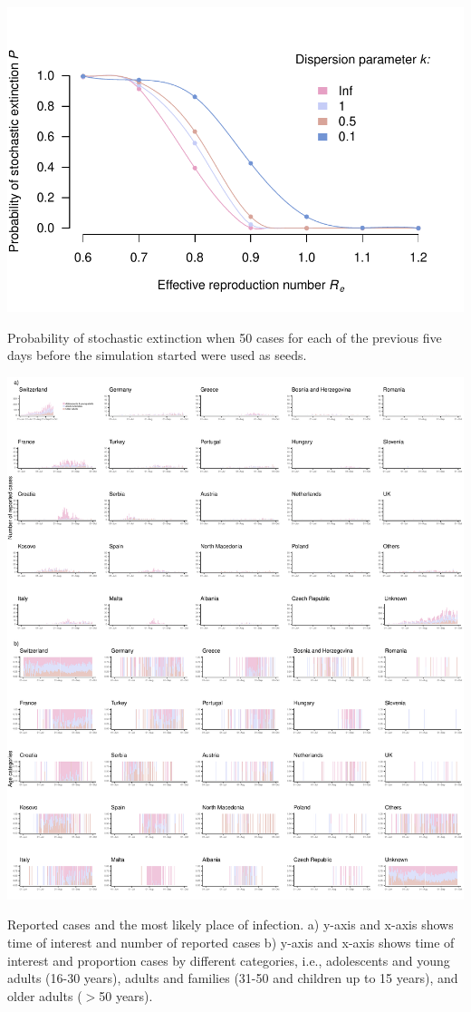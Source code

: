 \documentclass[10pt, a4paper, twoside]{article}
\begin{document}
\clearpage
\begin{suppfigure}[h]
\centering
\includegraphics[scale=0.5]{P_extinction_2021-02-26.pdf}
\caption{Probability of stochastic extinction when 50 cases for each of the previous five days before the simulation started were used as seeds.}
\end{suppfigure}
\clearpage
\begin{suppfigure}[h]
\centering
\includegraphics[scale=0.4]{imports_per_country_day_2021-03-05.pdf}
\caption{Reported cases and the most likely place of infection. a) y-axis and x-axis shows time of interest and number of reported cases b) y-axis and x-axis shows time of interest and proportion cases by different categories, i.e., adolescents and young adults (16-30 years), adults and families (31-50 and children up to 15 years), and older adults ($>$50 years).}
\end{suppfigure}
\end{document}
